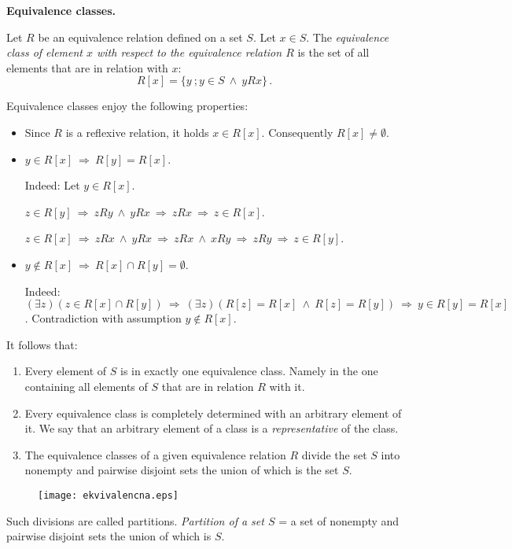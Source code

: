 \documentclass[11pt,paper=b5,footinclude,headinclude]{scrbook} %
\def\inn {{~\wedge~}}
\def\sledi {{~\Rightarrow~}}
\theoremstyle{remark}
\theoremstyle{definition} %
\theoremstyle{theorem} %
\begin{document}
\medskip
\textbf{ Equivalence classes.}

Let $R$ be an equivalence relation defined on a set $S$. Let $x\in S$. The {\em equivalence class of element $x$ with respect to the equivalence relation $R$} is the set of all elements that are in relation with $x$:
$$R[x] = \{y~;y\in S \inn yRx\}\,.$$

Equivalence classes enjoy the following properties:
\begin{itemize}
  \item Since $R$ is a reflexive relation, it holds $x\in R[x]$. Consequently $R[x]\neq \emptyset$.
  \item $y\in R[x]\sledi R[y]=R[x]$.

  Indeed: Let $y\in R[x]$.

  $z\in R[y]\sledi zRy\inn yRx\sledi zRx\sledi z\in R[x]$.

  $z\in R[x]\sledi zRx\inn yRx\sledi zRx\inn xRy \sledi zRy\sledi z\in R[y]$.
  \item $y\not\in R[x]\sledi R[x]\cap R[y]=\emptyset$.

  Indeed: $(\exists z)(z\in R[x]\cap R[y])\sledi (\exists z)(R[z] = R[x]\inn R[z] = R[y])\sledi
  y\in R[y]=R[x]$. Contradiction with assumption $y\not\in R[x]$.
  \end{itemize}

It follows that:
\begin{enumerate}
  \item Every element of $S$ is in exactly one equivalence class. Namely in the one containing all elements of $S$ that are in relation $R$ with it.
  \item Every equivalence class is completely determined with an arbitrary element of it. We say that an arbitrary element of a class is a {\em representative} of the class.
      \item The equivalence classes of a given equivalence relation $R$ divide the set $S$ into
      nonempty and pairwise disjoint sets the union of which is the set $S$.
      \end{enumerate}

\begin{figure}[htp]
\begin{center}
\texttt{[image: ekvivalencna.eps]}
\end{center}
\end{figure}

Such divisions are called partitions. {\em Partition of a set $S$} = a set of nonempty and pairwise disjoint sets the union of which is $S$.
\end{document}
